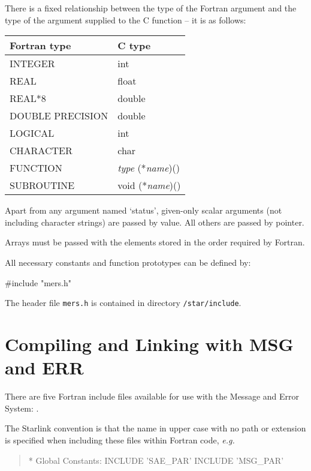 \documentclass[twoside,11pt]{starlink}
\begin{document}
There is a fixed relationship between the type of the Fortran
argument and the type of the argument supplied to the C function -- it is
as follows:
\begin{center}
\begin{tabular}{|l|l|}
\hline
Fortran type & C type \\
\hline
INTEGER & int \\
REAL & float \\
REAL*8 & double \\
DOUBLE PRECISION & double \\
LOGICAL & int \\
CHARACTER & char \\
FUNCTION & \textit{type} (*\textit{name})() \\
SUBROUTINE & void (*\textit{name})() \\
\hline
\end{tabular}
\end{center}

Apart from any argument named `status', given-only scalar arguments (not
including character strings) are passed by value.
All others are passed by pointer.

Arrays must be passed with the elements stored in the order required by Fortran.

All necessary constants and function prototypes can be defined by:
\begin{terminalv}
#include "mers.h"
\end{terminalv}
The header file \texttt{mers.h} is contained in directory
\texttt{/star/include}.

\section{Compiling and Linking with MSG and ERR
\label{compiling_and_linking}}
There are five Fortran include files available for use with the Message and
Error System:
.

The Starlink convention
is that the name in upper case with no path or extension is specified when
including these files within Fortran code,
\textit{e.g.}
\begin{quote}
\begin{small}
\begin{terminalv}
*  Global Constants:
      INCLUDE 'SAE_PAR'
      INCLUDE 'MSG_PAR'
\end{terminalv}
\end{small}
\end{quote}
\end{document}
